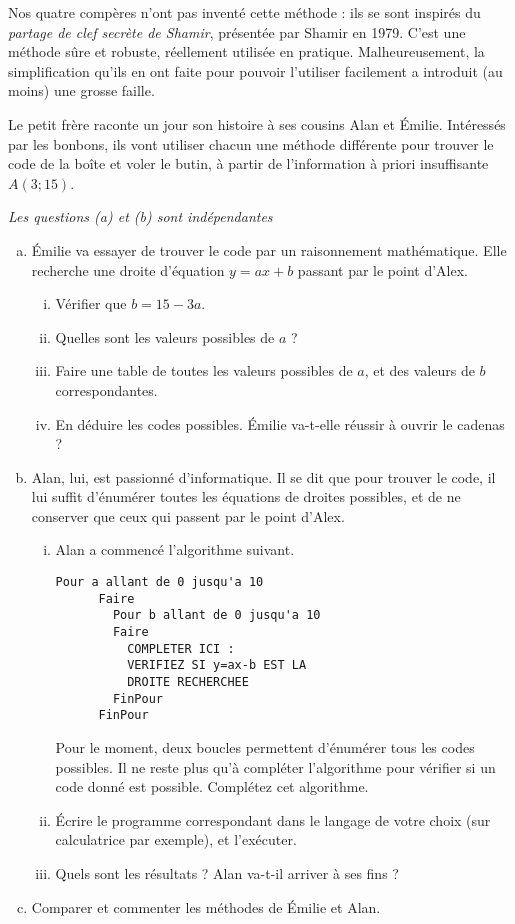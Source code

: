 \documentclass[11pt]{article}
\begin{document}
\begin{question}
  Nos quatre compères n'ont pas inventé cette méthode : ils se sont inspirés du
  \emph{partage de clef secrète de Shamir}, présentée par Shamir en 1979.
  C'est une méthode sûre et robuste, réellement utilisée en pratique.
  Malheureusement, la simplification qu'ils en ont faite pour pouvoir
  l'utiliser facilement a introduit (au moins) une grosse faille.

  Le petit frère raconte un jour son histoire à ses cousins Alan et Émilie.
  Intéressés par les bonbons, ils vont utiliser chacun une méthode
  différente pour trouver le code de la boîte et voler le butin, à partir de l'information à priori insuffisante $A(3;15)$.

  \emph{Les questions (a) et (b) sont indépendantes}
  \begin{enumerate}[(a)]
    \item Émilie va essayer de trouver le
      code par un raisonnement mathématique. Elle
      recherche une droite d'équation $y=ax+b$ passant par le
      point d'Alex.
      \begin{enumerate}[(i)]
        \item Vérifier que $b=15-3a$.
        \item Quelles sont les valeurs possibles de $a$ ?
        \item Faire une table de toutes les valeurs possibles
          de $a$, et des valeurs de $b$ correspondantes.
        \item En déduire les codes possibles. Émilie
          va-t-elle réussir à ouvrir le cadenas ?
      \end{enumerate}
    \item Alan, lui, est passionné d'informatique. Il se dit que pour trouver
      le code, il lui suffit d'énumérer toutes les équations de droites
      possibles, et de ne conserver que ceux qui passent par le point d'Alex.
      \begin{enumerate}[(i)]
        \item Alan a commencé l'algorithme suivant.
      \begin{lstlisting}[language=naturel,frame=lines,mathescape=true]
      Pour a allant de 0 jusqu'a 10
      Faire
        Pour b allant de 0 jusqu'a 10
        Faire
          COMPLETER ICI :
          VERIFIEZ SI y=ax-b EST LA
          DROITE RECHERCHEE
        FinPour
      FinPour
      \end{lstlisting}
      Pour le moment, deux boucles permettent d'énumérer tous les codes
      possibles. Il ne reste plus qu'à compléter l'algorithme pour vérifier
      si un code donné est possible. Complétez cet algorithme.
        \item Écrire le programme correspondant dans le langage de votre
          choix (sur calculatrice par exemple), et l'exécuter.
        \item Quels sont les résultats ? Alan va-t-il arriver à ses fins ?
      \end{enumerate}
    \item Comparer et commenter les méthodes de Émilie et Alan.
  \end{enumerate}
\end{question}
\end{document}
